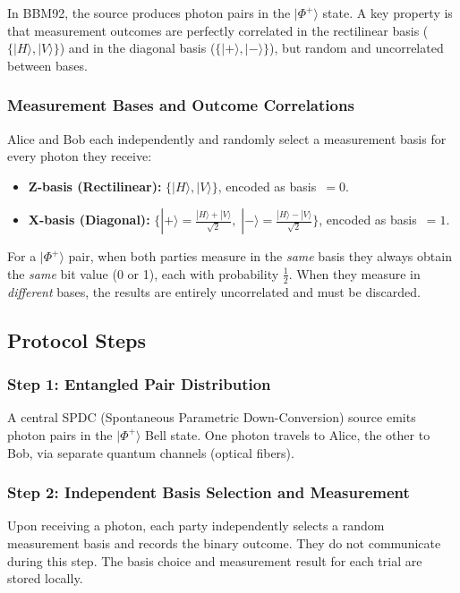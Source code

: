 \documentclass[12pt,oneside,letterpaper,english]{article}
\begin{document}
In BBM92, the source produces photon pairs in the $|\Phi^+\rangle$ state. A key property is that measurement outcomes are perfectly correlated in the rectilinear basis ($\{|H\rangle,|V\rangle\}$) and in the diagonal basis ($\{|+\rangle,|-\rangle\}$), but random and uncorrelated between bases.

\subsubsection{Measurement Bases and Outcome Correlations}

Alice and Bob each independently and randomly select a measurement basis for every photon they receive:

\begin{itemize}
    \item \textbf{Z-basis (Rectilinear):} $\{|H\rangle, |V\rangle\}$, encoded as basis~$= 0$.
    \item \textbf{X-basis (Diagonal):} $\{|+\rangle = \frac{|H\rangle+|V\rangle}{\sqrt{2}},\; |-\rangle = \frac{|H\rangle-|V\rangle}{\sqrt{2}}\}$, encoded as basis~$= 1$.
\end{itemize}

For a $|\Phi^+\rangle$ pair, when both parties measure in the \emph{same} basis they always obtain the \emph{same} bit value (0 or 1), each with probability $\frac{1}{2}$. When they measure in \emph{different} bases, the results are entirely uncorrelated and must be discarded.

\subsection{Protocol Steps}

\subsubsection{Step 1: Entangled Pair Distribution}

A central SPDC (Spontaneous Parametric Down-Conversion) source emits photon pairs in the $|\Phi^+\rangle$ Bell state. One photon travels to Alice, the other to Bob, via separate quantum channels (optical fibers).

\subsubsection{Step 2: Independent Basis Selection and Measurement}

Upon receiving a photon, each party independently selects a random measurement basis and records the binary outcome. They do not communicate during this step. The basis choice and measurement result for each trial are stored locally.
\end{document}
